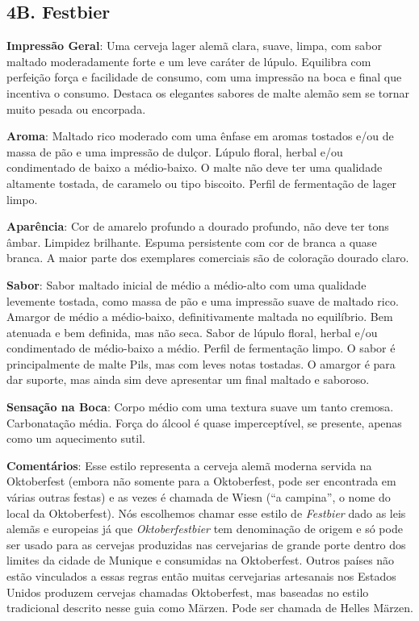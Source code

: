 \subsection*{4B. Festbier}
\textbf{Impressão Geral}: Uma cerveja lager alemã clara, suave, limpa, com sabor maltado moderadamente forte e um leve caráter de lúpulo. Equilibra com perfeição força e facilidade de consumo, com uma impressão na boca e final que incentiva o consumo. Destaca os elegantes sabores  de malte alemão sem se tornar muito pesada ou encorpada.

\textbf{Aroma}: Maltado rico moderado com uma ênfase em aromas tostados e/ou de massa de pão e uma impressão de dulçor. Lúpulo floral, herbal e/ou condimentado de baixo a médio-baixo. O malte não deve ter uma qualidade altamente tostada, de caramelo ou tipo biscoito. Perfil de fermentação de lager limpo.

\textbf{Aparência}: Cor de amarelo profundo a dourado profundo, não deve ter tons âmbar. Limpidez brilhante. Espuma persistente com cor de branca a quase branca. A maior parte dos exemplares comerciais são de coloração dourado claro.

\textbf{Sabor}: Sabor maltado inicial de médio a médio-alto com uma qualidade levemente tostada, como massa de pão e uma impressão suave de maltado rico. Amargor de médio a médio-baixo, definitivamente maltada no equilíbrio. Bem atenuada e bem definida, mas não seca. Sabor de lúpulo floral, herbal e/ou condimentado de médio-baixo a médio. Perfil de fermentação limpo. O sabor é principalmente de malte Pils, mas com leves notas tostadas. O amargor é para dar suporte, mas ainda sim deve apresentar um final maltado e saboroso.

\textbf{Sensação na Boca}: Corpo médio com uma textura suave um tanto cremosa. Carbonatação média. Força do álcool é quase imperceptível, se presente, apenas como um aquecimento sutil.

\textbf{Comentários}: Esse estilo representa a cerveja alemã moderna servida na Oktoberfest (embora não somente para a Oktoberfest, pode ser encontrada em várias outras festas) e as vezes é chamada de Wiesn (“a campina”, o nome do local da Oktoberfest). Nós escolhemos chamar esse estilo de \textit{Festbier} dado as leis alemãs e europeias já que \textit{Oktoberfestbier} tem denominação de origem e só pode ser usado para as cervejas produzidas nas cervejarias de grande porte dentro dos limites da cidade de Munique e consumidas na Oktoberfest. Outros países não estão vinculados a essas regras então muitas cervejarias artesanais nos Estados Unidos produzem cervejas chamadas Oktoberfest, mas baseadas no estilo tradicional descrito nesse guia como Märzen. Pode ser chamada de Helles Märzen.

